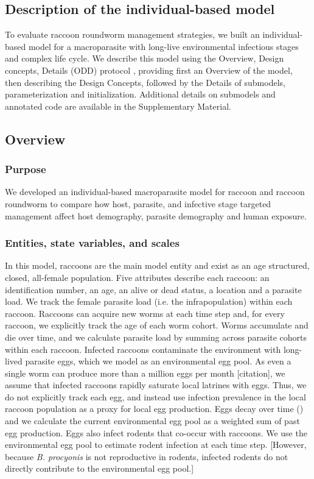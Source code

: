 \documentclass[11pt]{article}
\begin{document}
\subsection{Description of the individual-based model}

To evaluate raccoon roundworm management strategies, we built an
individual-based model for a macroparasite with long-live
environmental infectious stages and complex life cycle. We describe this
model using the Overview, Design concepts, Details (ODD) protocol \citep{Grimm2006,Grimm2010}, providing first an Overview of the model, then
describing the Design Concepts, followed by the Details of submodels,
parameterization and initialization. Additional details on submodels and
annotated code are available in the Supplementary Material.

\subsection{Overview}

\subsubsection{Purpose}

We developed an individual-based macroparasite model for raccoon and
raccoon roundworm to compare how host, parasite, and infective stage
targeted management affect host demography, parasite demography and
human exposure.

\subsubsection{Entities, state variables, and scales}

In this model, raccoons are the main model entity and exist as an age
structured, closed, all-female population. Five attributes describe each raccoon: an identification number, an age, an alive
or dead status, a location and a parasite load. We track the female parasite
load (i.e. the infrapopulation) within each raccoon. Raccoons can acquire new
worms at each time step and, for every raccoon, we explicitly track the age of each
worm cohort. Worms accumulate and die over time, and we
calculate parasite load by summing across parasite cohorts within each raccoon.
Infected raccoons contaminate the environment with long-lived parasite
eggs, which we model as an environmental egg pool. As even a single worm
can produce more than a million eggs per month [citation], we assume that infected
raccoons rapidly saturate local latrines with eggs. Thus, we do not
explicitly track each egg, and instead use infection prevalence in the
local raccoon population as a proxy for local egg production. Eggs decay
over time () and we calculate the current environmental egg pool as a
weighted sum of past egg production. Eggs also infect rodents that co-occur with raccoons. We use the
environmental egg pool to estimate rodent infection at each time step. [However, because \emph{B. procyonis} is not reproductive in rodents, infected rodents do not directly contribute to the environmental egg pool.]
\end{document}
